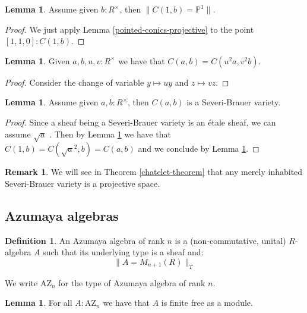 \documentclass[10pt,a4paper]{article}
\theoremstyle{definition}
\newtheorem{lemma}[theorem]{Lemma}
\newtheorem{definition}[theorem]{Definition}
\newtheorem{remark}[theorem]{Remark}
\newcommand{\AZ}{\mathrm{AZ}}
\newcommand{\propTrunc}[1]{\lVert #1 \rVert}
\newcommand{\bP}{\mathbb{P}}
\begin{document}
\begin{lemma}\label{conic-one-split}
Assume given $b:R^\times$, then $\propTrunc{C(1,b) = \bP^1}$.
\end{lemma}

\begin{proof}
We just apply Lemma \ref{pointed-conics-projective} to the point $[1,1,0]:C(1,b)$.
\end{proof}

\begin{lemma}\label{conic-change-variable}
Given $a,b,u,v:R^\times$ we have that $C(a,b) = C(u^2a,v^2b)$.
\end{lemma}

\begin{proof}
Consider the change of variable $y\mapsto uy$ and $z\mapsto vz$.
\end{proof}

\begin{lemma}
Assume given $a,b:R^\times$, then $C(a,b)$ is a Severi-Brauer variety.
\end{lemma}

\begin{proof}
Since a sheaf being a Severi-Brauer variety is an \'etale sheaf, we can assume $\sqrt{a}$ . Then by Lemma \ref{conic-change-variable} we have that $C(1,b) = C(\sqrt{a}^2,b)=C(a,b)$ and we conclude by Lemma \ref{conic-one-split}.
\end{proof}

\begin{remark}
We will see in Theorem \ref{chatelet-theorem} that any merely inhabited Severi-Brauer variety is a projective space. 
\end{remark}


\subsection{Azumaya algebras}

\begin{definition}
An Azumaya algebra of rank $n$ is a (non-commutative, unital) $R$-algebra $A$ such that its underlying type is a sheaf and:
\[\propTrunc{A=M_{n+1}(R)}_T\]
\end{definition}

We write $\AZ_n$ for the type of Azumaya algebra of rank $n$.

\begin{lemma}\label{azumayas-are-finite-free}
For all $A:\AZ_n$ we have that $A$ is finite free as a module.
\end{lemma}
\end{document}
